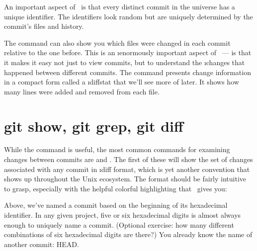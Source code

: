 \documentclass[letterpaper,12pt,titlepage,twoside]{article}
\begin{document}
An important aspect of \git\ is that every distinct commit in the universe has
a unique identifier. The identifiers look random but are uniquely determined
by the commit's files and history.


The  command can also show you which files were changed in each
commit relative to the one before. This is an \i{enormously} important aspect
of \git\ --- is that it makes it easy not just to view commits, but to
understand the \i{changes} that happened between different commits. The
 command presents change information in a compact form called a
\i{diffstat} that we'll see more of later. It shows how many lines were added
and removed from each file.




\section{git show, git grep, git diff}

While the  command is useful, the most common commands for
examining changes between commits are  and . The first of
these will show the set of changes associated with any commit in \i{diff
  format}, which is yet another convention that shows up throughout the Unix
ecosystem. The format should be fairly intuitive to grasp, especially with the
helpful colorful highlighting that \git\ gives you:


Above, we've named a commit based on the beginning of its hexadecimal
identifier. In any given project, five or six hexadecimal digits is almost
always enough to uniquely name a commit. (Optional exercise: how many
different combinations of six hexadecimal digits are there?) You already know
the name of another commit: HEAD.
\end{document}
